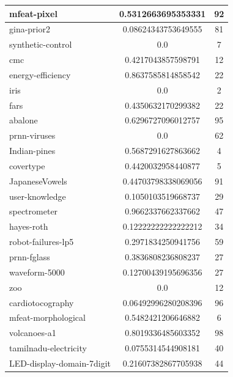 \documentclass[times,specification,annotation]{itmo-student-thesis}
\begin{document}
\begin{center}
\begin{longtable}{ |m{5cm}|c|c| }
			\hline
			mfeat-pixel & 0.5312663695353331 & 92 \\
			\hline
			gina-prior2 & 0.08624343753649555 & 81 \\
			\hline
			synthetic-control & 0.0 & 7 \\
			\hline
			cmc & 0.4217043857598791 & 12 \\
			\hline
			energy-efficiency & 0.8637585814858542 & 22 \\
			\hline
			iris & 0.0 & 2 \\
			\hline
			fars & 0.4350632170299382 & 22 \\
			\hline
			abalone & 0.6296727096012757 & 95 \\
			\hline
			prnn-viruses & 0.0 & 62 \\
			\hline
			Indian-pines & 0.5687291627863662 & 4 \\
			\hline
			covertype & 0.4420032958440877 & 5 \\
			\hline
			JapaneseVowels & 0.44703798338069056 & 91 \\
			\hline
			user-knowledge & 0.1050103519668737 & 29 \\
			\hline
			spectrometer & 0.9662337662337662 & 47 \\
			\hline
			hayes-roth & 0.12222222222222212 & 34 \\
			\hline
			robot-failures-lp5 & 0.2971834250941756 & 59 \\
			\hline
			prnn-fglass & 0.3836808236808237 & 27 \\
			\hline
			waveform-5000 & 0.12700439195696356 & 27 \\
			\hline
			zoo & 0.0 & 12 \\
			\hline
			cardiotocography & 0.06492996280208396 & 96 \\
			\hline
			mfeat-morphological & 0.5482421206646882 & 6 \\
			\hline
			volcanoes-a1 & 0.8019336485603352 & 98 \\
			\hline
			tamilnadu-electricity & 0.0755314544908181 & 40 \\
			\hline
			LED-display-domain-7digit & 0.21607382867705938 & 44 \\
			\hline 
			
		\end{longtable}
	\end{center}
\end{document}

